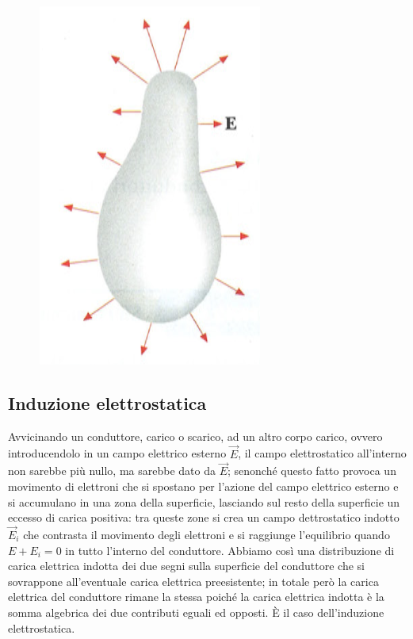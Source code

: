 \documentclass[class=book, crop=false, oneside, 12pt]{standalone}
\begin{document}
\begin{figure}[h]
    \includegraphics[scale=0.4]{conduttore_linee.png}
    \centering
    \caption{}
\end{figure}

\subsection{Induzione elettrostatica}

Avvicinando un conduttore, carico o scarico, ad un altro corpo carico, ovvero introducendolo in un campo elettrico esterno \(\overrightarrow{E}\), il campo elettrostatico all'interno non sarebbe più nullo, ma sarebbe dato da \(\overrightarrow{E}\); senonché questo fatto provoca un movimento di elettroni che si spostano per l'azione del campo elettrico esterno e si accumulano in una zona della superficie, lasciando sul resto della superficie un eccesso di carica positiva: 
tra queste zone si crea un campo dettrostatico indotto \(\overrightarrow{E}_i\) che contrasta il movimento degli elettroni e si raggiunge l'equilibrio quando \(E + E_i = 0\) in tutto l'interno del conduttore.
Abbiamo così una distribuzione di carica elettrica indotta dei due segni sulla superficie del conduttore che si sovrappone all'eventuale carica elettrica preesistente; in totale però la carica elettrica del conduttore rimane la stessa poiché la carica elettrica indotta è la somma algebrica dei due contributi eguali ed opposti.
È il caso dell'induzione elettrostatica.
\end{document}
